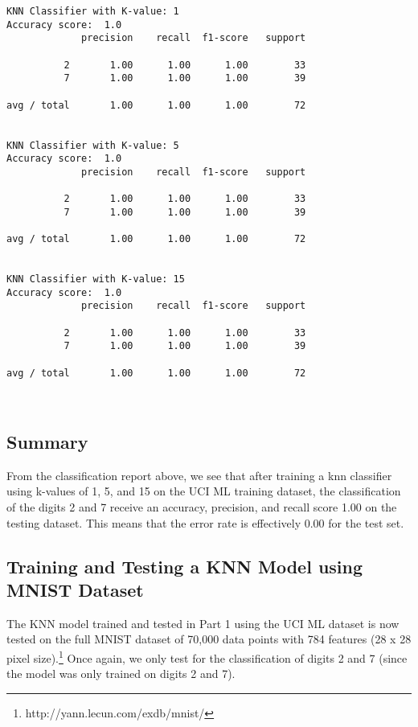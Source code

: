 \documentclass[11pt]{article}
\begin{document}
\pagebreak
    \begin{Verbatim}[commandchars=\\\{\},fontsize=\footnotesize]
KNN Classifier with K-value: 1
Accuracy score:  1.0
             precision    recall  f1-score   support

          2       1.00      1.00      1.00        33
          7       1.00      1.00      1.00        39

avg / total       1.00      1.00      1.00        72


KNN Classifier with K-value: 5
Accuracy score:  1.0
             precision    recall  f1-score   support

          2       1.00      1.00      1.00        33
          7       1.00      1.00      1.00        39

avg / total       1.00      1.00      1.00        72


KNN Classifier with K-value: 15
Accuracy score:  1.0
             precision    recall  f1-score   support

          2       1.00      1.00      1.00        33
          7       1.00      1.00      1.00        39

avg / total       1.00      1.00      1.00        72



    \end{Verbatim}

    \subsection*{Summary}

From the classification report above, we see that after training a knn
classifier using k-values of 1, 5, and 15 on the UCI ML training
dataset, the classification of the digits 2 and 7 receive an accuracy,
precision, and recall score 1.00 on the testing dataset. This means that
the error rate is effectively 0.00 for the test set.
\pagebreak
    \subsection{Training and Testing a KNN Model using MNIST Dataset}

The KNN model trained and tested in Part 1 using the UCI ML dataset is
now tested on the full MNIST dataset of 70,000 data points with 784
features (28 x 28 pixel size).\footnote{http://yann.lecun.com/exdb/mnist/} Once again, we only test for the
classification of digits 2 and 7 (since the model was only trained on
digits 2 and 7).
\end{document}
